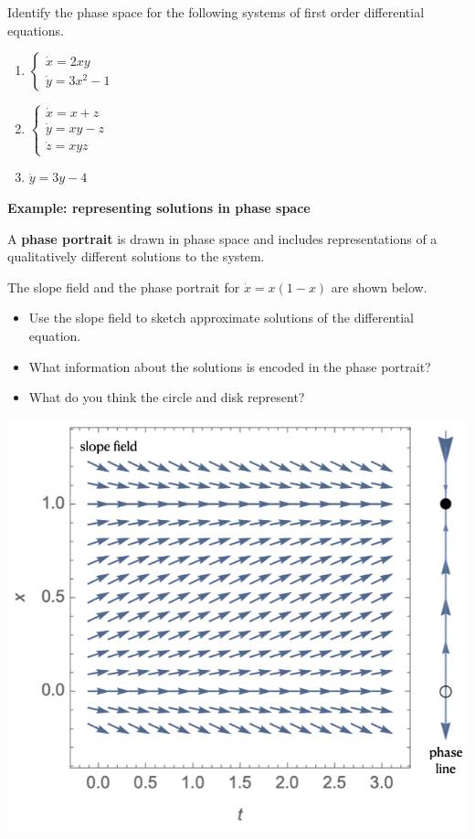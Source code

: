\documentclass[12pt,letterpaper,noanswers]{exam}
\begin{document}
    Identify the phase space for the following systems of first order differential equations.
    \begin{enumerate}
        \item $\left\{\begin{array}{l} \dot x = 2xy \\
        \dot y = 3x^2 - 1
        \end{array}\right.$
        \item $\left\{\begin{array}{l} \dot x = x + z \\
        \dot y = xy - z \\
        \dot z = xyz
        \end{array}\right.$
        \item $\dot y = 3y - 4$ \\
    \end{enumerate}
    

    \noindent\textbf{Example: representing solutions in phase space}
    \begin{tcolorbox}
    A \textbf{phase portrait} is drawn in phase space and includes representations of a qualitatively different solutions to the system.
    \end{tcolorbox}
    The slope field and the phase portrait for $\dot x = x(1-x)$ are shown below.
    \begin{itemize}
        \item Use the slope field to sketch approximate solutions of the differential equation.
        \item What information about the solutions is encoded in the phase portrait?  
        \vspace{1in}
        
        \item What do you think the circle and disk represent?
        \vspace{0.6in}
    \end{itemize}
    
    
    \includegraphics{img/C34slopep1b.png}
    
\end{document}
